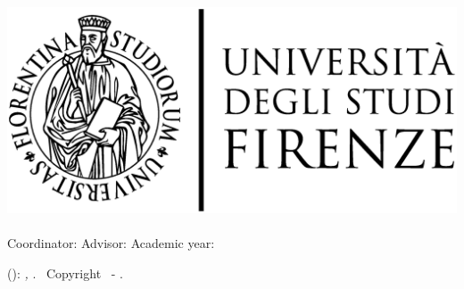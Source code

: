 \begin{titlepage}
	\begin{center}
   	\large
      \hfill
      \vfill
      \begingroup
			\spacedallcaps{\myUni} \\ 
			\myFaculty \\
			\myDegree \\ 
			\vspace{0.5cm}
         \includegraphics[width=.5\textwidth]{logo/logoUnifiName.eps}\\
         \vspace{0.5cm}    
      \endgroup 
      \vfill 
      \begingroup
      	\color{Maroon}\spacedallcaps{\myTitle} \\ \bigskip
      \endgroup
      \spacedlowsmallcaps{\myName}
      \vfill  
      Coordinator: {\itshape\myProf}
      \vfill
      Advisor: {\itshape\mySupervisor}
      \vfill
      Academic year: {\itshape\myAcademicYear}
      \vfill                      
	\end{center}        
\end{titlepage}   
   \newpage
	\thispagestyle{empty}
	\hfill
	\vfill
	\noindent\myName(\texttt{\myMail}): 
	\textit{\myTitle,} 
	\myDegree. \textcopyright\ Copyright \myYear \myName\ - \mycopyright.
